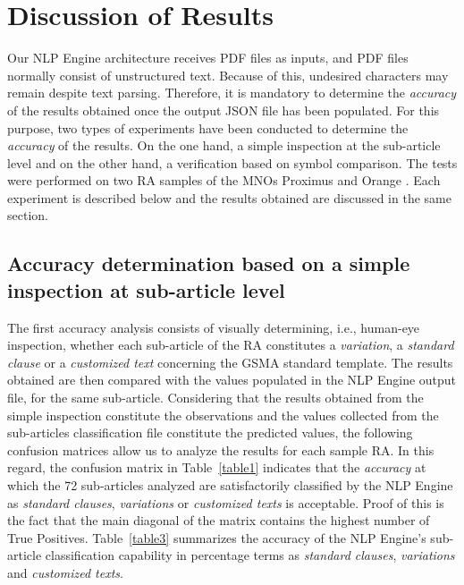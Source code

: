 \section{Discussion of Results}\label{results}
Our NLP Engine architecture receives PDF files as inputs, and PDF files normally consist of unstructured text. Because of this, undesired characters may remain despite text parsing. Therefore, it is mandatory to determine the \textit{accuracy} of the results obtained once the output JSON file has been populated. For this purpose, two types of experiments have been conducted to determine the \textit{accuracy} of the results. On the one hand, a simple inspection at the sub-article level and on the other hand, a verification based on symbol comparison. The tests were performed on two RA samples of the MNOs Proximus and Orange \cite{proximus}. Each experiment is described below and the results obtained are discussed in the same section.

\subsection{Accuracy determination based on a simple inspection at sub-article level}
The first accuracy analysis consists of visually determining, i.e., human-eye inspection, whether each sub-article of the RA constitutes a \textit{variation}, a \textit{standard clause} or a \textit{customized text} concerning the GSMA standard template. The results obtained are then compared with the values populated in the NLP Engine output file, for the same sub-article. Considering that the results obtained from the simple inspection constitute the observations and the values collected from the sub-articles classification file constitute the predicted values, the following confusion matrices allow us to analyze the results for each sample RA. In this regard, the confusion matrix in Table~\ref{table1} indicates that the \textit{accuracy} at which the 72 sub-articles analyzed are satisfactorily classified by the NLP Engine as \textit{standard clauses}, \textit{variations} or \textit{customized texts} is acceptable. Proof of this is the fact that the main diagonal of the matrix contains the highest number of True Positives. Table~\ref{table3} summarizes the accuracy of the NLP Engine's sub-article classification capability in percentage terms as \textit{standard clauses}, \textit{variations} and \textit{customized texts}.

